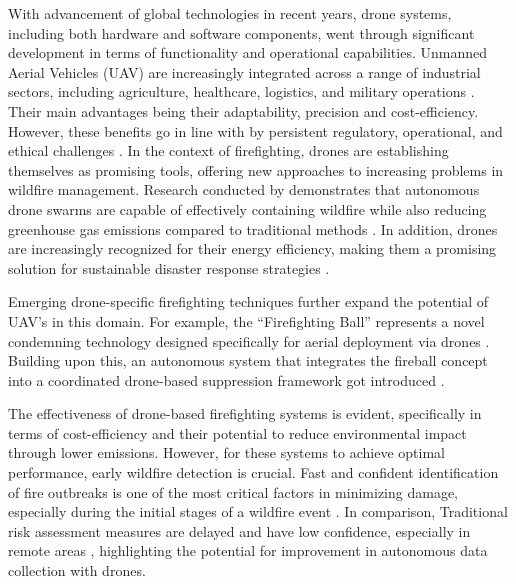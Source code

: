\documentclass[11pt, a4paper]{article}
\begin{document}
With advancement of global technologies in recent years, drone systems, including both hardware and software components, went through significant development in terms of functionality and operational capabilities. Unmanned Aerial Vehicles (UAV) are increasingly integrated across a range of industrial sectors, including agriculture, healthcare, logistics, and military operations \citep{emimiCurrentOpportunitiesChallenges2023}. Their main advantages being their adaptability, precision and cost-efficiency. However, these benefits go in line with by persistent regulatory, operational, and ethical challenges \citep{emimiCurrentOpportunitiesChallenges2023}.
In the context of firefighting, drones are establishing themselves as promising tools, offering new approaches to increasing problems in wildfire management. Research conducted by \citet*{Saffre2022} demonstrates that autonomous drone swarms are capable of effectively containing wildfire while also reducing greenhouse gas emissions compared to traditional methods \citep{Saffre2022}. In addition, drones are increasingly recognized for their energy efficiency, making them a promising solution for sustainable disaster response strategies \citep{stolaroffEnergyUseLife2018}.

Emerging drone-specific firefighting techniques further expand the potential of UAV's in this domain. For example, the “Firefighting Ball” represents a novel condemning technology designed specifically for aerial deployment via drones \citep{fireBalls}. Building upon this, an autonomous system that integrates the fireball concept into a coordinated drone-based suppression framework got introduced \citep{alkhatibProposedAutomaticForest2024}.

The effectiveness of drone-based firefighting systems is evident, specifically in terms of cost-efficiency and their potential to reduce environmental impact through lower emissions. However, for these systems to achieve optimal performance, early wildfire detection is crucial. Fast and confident identification of fire outbreaks is one of the most critical factors in minimizing damage, especially during the initial stages of a wildfire event \citep{Sudhakar2020}.
In comparison, Traditional risk assessment measures are delayed and have low confidence, especially in remote areas \citep{Afghah2019}, highlighting the potential for improvement in autonomous data collection \citep{Lelis2024} with drones.
\end{document}
